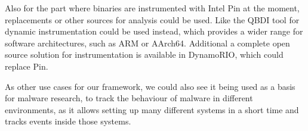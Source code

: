 Also for the part where binaries are instrumented with Intel Pin at the moment,
replacements or other sources for analysis could be used. Like the
QBDI\cite{qbdi} tool for dynamic instrumentation could be used instead, which
provides a wider range for software architectures, such as ARM or AArch64.
Additional a complete open source solution for instrumentation is available in
DynamoRIO\cite{dynrio}, which could replace Pin.

As other use cases for our framework, we could also see it being used as a basis
for malware research, to track the behaviour of malware in different
environments, as it allows setting up many different systems in a short time and
tracks events inside those systems.

